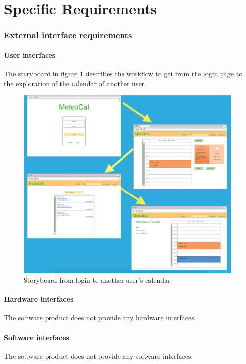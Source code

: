\documentclass[10pt,a4paper,titlepage]{article}
\begin{document}
\clearpage
\part{Specific Requirements}

\section{External interface requirements}

\subsection{User interfaces}
The storyboard in figure \ref{fig:Storyboard} describes the workflow to get from the login page to the exploration of the calendar of another user.
\begin{figure}[h!]
\centering
\includegraphics[width=\linewidth]{./UI_mockups/storyboard.png}
\caption[Storyboard]{Storyboard from login to another user's calendar}
\label{fig:Storyboard}
\end{figure}

\subsection{Hardware interfaces}
The software product does not provide any hardware interfaces.

\subsection{Software interfaces}
The software product does not provide any software interfaces.
\end{document}
